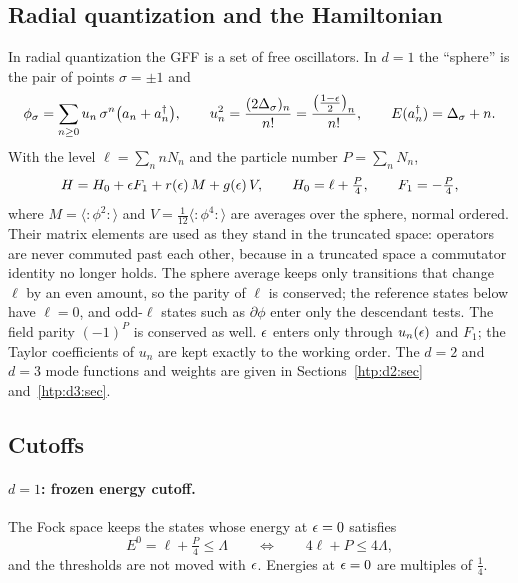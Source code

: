 \subsection{Radial quantization and the Hamiltonian}
In radial quantization the GFF is a set of free oscillators. In $d=1$ the ``sphere'' is the pair of points
$\sigma=\pm1$ and
\begin{equation}
 \phi_\sigma=\sum_{n\ge0}u_n\,\sigma^n\big(a_n+a_n^\dagger\big),\qquad
 u_n^2=\frac{(2\Delta_\sigma)_n}{n!}=\frac{\big(\tfrac{1-\epsilon}2\big)_n}{n!},\qquad E(a_n^\dagger)=\Delta_\sigma+n .
 \label{htp:eq:modes}
\end{equation}
With the level $\ell=\sum_n nN_n$ and the particle number $P=\sum_nN_n$,
\begin{equation}
 H=H_0+\epsilon F_1+r(\epsilon)\,M+g(\epsilon)\,V,\qquad H_0=\ell+\tfrac P4,\qquad F_1=-\tfrac P4,
 \label{htp:eq:H}
\end{equation}
where $M=\langle{:}\phi^2{:}\rangle$ and $V=\tfrac1{12}\langle{:}\phi^4{:}\rangle$ are averages over the sphere, normal
ordered. Their matrix elements are used as they stand in the truncated space: operators are never commuted past each
other, because in a truncated space a commutator identity no longer holds. The sphere average keeps only transitions
that change $\ell$ by an even amount, so the parity of $\ell$ is conserved; the reference states below have $\ell=0$, and
odd-$\ell$ states such as $\partial\phi$ enter only the descendant tests. The field parity $(-1)^P$ is conserved as
well. $\epsilon$ enters only through $u_n(\epsilon)$ and $F_1$; the Taylor coefficients of $u_n$ are kept exactly to the working
order. The $d=2$ and $d=3$ mode functions and weights are given in Sections~\ref{htp:d2:sec} and~\ref{htp:d3:sec}.

\subsection{Cutoffs}
\paragraph{$d=1$: frozen energy cutoff.} The Fock space keeps the states whose energy at $\epsilon=0$ satisfies
\begin{equation}
 E^0=\ell+\tfrac P4\le\Lambda\qquad\Longleftrightarrow\qquad 4\ell+P\le4\Lambda ,
 \label{htp:eq:Lambda}
\end{equation}
and the thresholds are not moved with $\epsilon$. Energies at $\epsilon=0$ are multiples of $\tfrac14$.

